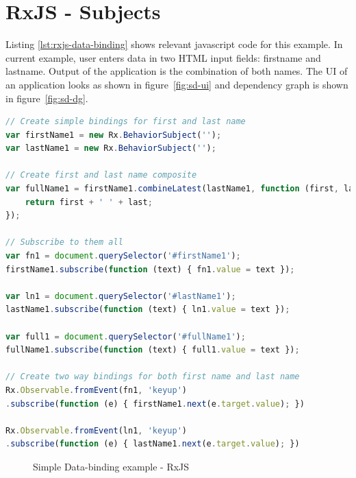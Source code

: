 \section{RxJS - Subjects}
Listing \ref{lst:rxjs-data-binding} shows relevant javascript code for this example. In current example, user enters data in two HTML input fields: firstname and lastname. Output of the application is the combination of both names. The UI of an application looks as shown in figure~\ref{fig:sd-ui} and dependency graph is shown in figure~\ref{fig:sd-dg}. 

\begin{lstlisting}[language=JavaScript, caption=RxJS - Databinding example, label={lst:rxjs-data-binding}]
// Create simple bindings for first and last name
var firstName1 = new Rx.BehaviorSubject('');
var lastName1 = new Rx.BehaviorSubject('');

// Create first and last name composite
var fullName1 = firstName1.combineLatest(lastName1, function (first, last) {
	return first + ' ' + last;
});

// Subscribe to them all
var fn1 = document.querySelector('#firstName1');
firstName1.subscribe(function (text) { fn1.value = text });

var ln1 = document.querySelector('#lastName1');
lastName1.subscribe(function (text) { ln1.value = text });

var full1 = document.querySelector('#fullName1');
fullName1.subscribe(function (text) { full1.value = text });

// Create two way bindings for both first name and last name
Rx.Observable.fromEvent(fn1, 'keyup')
.subscribe(function (e) { firstName1.next(e.target.value); })

Rx.Observable.fromEvent(ln1, 'keyup')
.subscribe(function (e) { lastName1.next(e.target.value); })
\end{lstlisting}


\begin{figure}[!h]
	\centering
	\hfill
	\caption{Simple Data-binding example - RxJS}
\end{figure}

